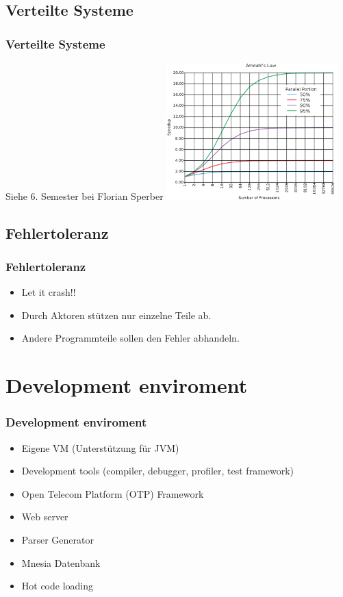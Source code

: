 \subsection{Verteilte Systeme}
\begin{frame} %
  \frametitle{Verteilte Systeme} %
    Siehe 6. Semester bei Florian Sperber
    \includegraphics[width=250px]{img/amdahl}
\end{frame}

\subsection{Fehlertoleranz}
\begin{frame} %
  \frametitle{Fehlertoleranz} %
  \begin{itemize} %
    \item Let it crash!!
    \item Durch Aktoren stützen nur einzelne Teile ab.
    \item Andere Programmteile sollen den Fehler abhandeln.
  \end{itemize}
\end{frame}

\section{Development enviroment}
\begin{frame} %
  \frametitle{Development enviroment} %
  \begin{itemize} %
    \item Eigene VM (Unterstützung für JVM)
    \item Development tools (compiler, debugger, profiler, test framework)
    \item Open Telecom Platform (OTP) Framework
    \item Web server
    \item Parser Generator
    \item Mnesia Datenbank
    \item Hot code loading
  \end{itemize}
\end{frame}

